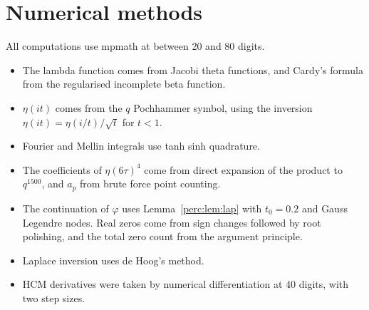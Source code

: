 \section{Numerical methods}\label{perc:sec:numerics}

All computations use mpmath at between 20 and 80 digits.
\begin{itemize}
\item The lambda function comes from Jacobi theta functions, and Cardy's formula from the regularised incomplete beta function.
\item $\eta(it)$ comes from the $q$ Pochhammer symbol, using the inversion $\eta(it) = \eta(i/t)/\sqrt t$ for $t<1$.
\item Fourier and Mellin integrals use tanh sinh quadrature.
\item The coefficients of $\eta(6\tau)^4$ come from direct expansion of the product to $q^{1500}$, and $a_p$ from brute force point counting.
\item The continuation of $\varphi$ uses Lemma~\ref{perc:lem:lap} with $t_0 = 0.2$ and Gauss Legendre nodes. Real zeros come from sign changes followed by root polishing, and the total zero count from the argument principle.
\item Laplace inversion uses de Hoog's method.
\item HCM derivatives were taken by numerical differentiation at 40 digits, with two step sizes.
\end{itemize}
